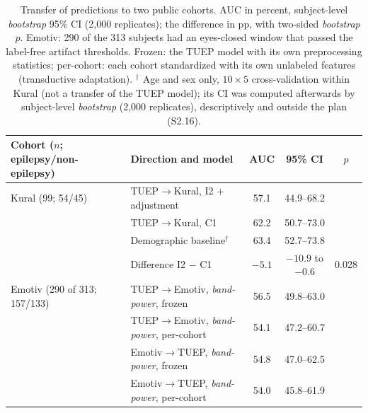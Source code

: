 \begin{table}[h]
\caption{Transfer of predictions to two public cohorts. AUC in percent, subject-level \textit{bootstrap} 95\% CI (2,000 replicates); the difference in pp, with two-sided \textit{bootstrap} $p$. Emotiv: 290 of the 313 subjects had an eyes-closed window that passed the label-free artifact thresholds. Frozen: the TUEP model with its own preprocessing statistics; per-cohort: each cohort standardized with its own unlabeled features (transductive adaptation). $^{\dagger}$ Age and sex only, $10\times5$ cross-validation within Kural (not a transfer of the TUEP model); its CI was computed afterwards by subject-level \textit{bootstrap} (2,000 replicates), descriptively and outside the plan (S2.16).}\label{tab:transfer}
\centering\scriptsize
\setlength{\tabcolsep}{3pt}\begin{tabular}{@{}llccc@{}}
\toprule
Cohort ($n$; epilepsy/non-epilepsy) & Direction and model & AUC & 95\% CI & $p$ \\
\midrule
Kural (99; 54/45) & TUEP$\to$Kural, I2 + adjustment & 57.1 & 44.9--68.2 & \\
 & TUEP$\to$Kural, C1 & 62.2 & 50.7--73.0 & \\
 & Demographic baseline$^{\dagger}$ & 63.4 & 52.7--73.8 & \\
 & Difference I2 $-$ C1 & $-5.1$ & $-10.9$ to $-0.6$ & 0.028 \\
Emotiv (290 of 313; 157/133) & TUEP$\to$Emotiv, \textit{band-power}, frozen & 56.5 & 49.8--63.0 & \\
 & TUEP$\to$Emotiv, \textit{band-power}, per-cohort & 54.1 & 47.2--60.7 & \\
 & Emotiv$\to$TUEP, \textit{band-power}, frozen & 54.8 & 47.0--62.5 & \\
 & Emotiv$\to$TUEP, \textit{band-power}, per-cohort & 54.0 & 45.8--61.9 & \\
\bottomrule
\end{tabular}
\end{table}
